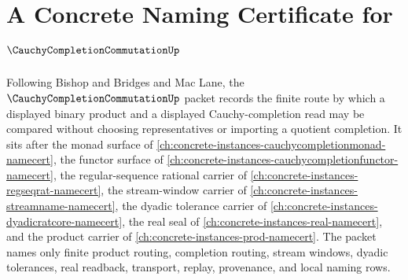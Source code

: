 \chapter{A Concrete Naming Certificate for $\CauchyCompletionCommutationUp$}
\label{ch:concrete-instances-cauchy-completion-commutation-namecert}

Following Bishop and Bridges and Mac Lane, the $\CauchyCompletionCommutationUp$ packet records the finite route by which a displayed binary product and a displayed Cauchy-completion read may be compared without choosing representatives or importing a quotient completion. It sits after the monad surface of \autoref{ch:concrete-instances-cauchycompletionmonad-namecert}, the functor surface of \autoref{ch:concrete-instances-cauchycompletionfunctor-namecert}, the regular-sequence rational carrier of \autoref{ch:concrete-instances-regseqrat-namecert}, the stream-window carrier of \autoref{ch:concrete-instances-streamname-namecert}, the dyadic tolerance carrier of \autoref{ch:concrete-instances-dyadicratcore-namecert}, the real seal of \autoref{ch:concrete-instances-real-namecert}, and the product carrier of \autoref{ch:concrete-instances-prod-namecert}. The packet names only finite product routing, completion routing, stream windows, dyadic tolerances, real readback, transport, replay, provenance, and local naming rows.

